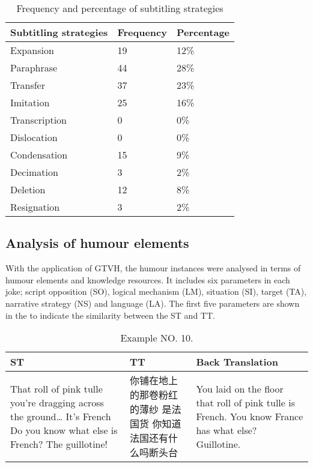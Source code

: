 \documentclass[english]{textolivre}
\begin{document}
\begin{table}[htpb]
\caption{Frequency and percentage of subtitling strategies}
\label{tbl09}
\begin{tabularx}{\linewidth}{XXX}
\toprule 
Subtitling strategies  & Frequency & Percentage \\ 
\midrule
Expansion & 19 & 12\% \\
Paraphrase & 44 & 28\% \\
Transfer & 37 & 23\% \\
Imitation & 25 & 16\% \\
Transcription & 0  & 0\% \\
Dislocation & 0  & 0\% \\
Condensation & 15  & 9\% \\
Decimation & 3  & 2\% \\
Deletion & 12  & 8\% \\
Resignation & 3  & 2\% \\
\bottomrule
\end{tabularx}
\end{table}

\subsection{Analysis of humour elements}

With the application of GTVH, the humour instances were analysed in terms of humour elements and knowledge resources. It includes six parameters in each joke; script opposition (SO), logical mechanism (LM), situation (SI), target (TA), narrative strategy (NS) and language (LA). The first five parameters are shown in the  to indicate the similarity between the ST and TT. 

\begin{table}[htpb]
\caption{Example NO. 10.}
\label{tbl10}
\begin{tabularx}{\linewidth}{XXX}
\toprule 
ST  & TT & Back Translation \\ 
\midrule
That roll of pink tulle you're dragging across the ground… 
It's French  
Do you know what else is French? 
The guillotine!  & 你铺在地上的那卷粉红的薄纱 
是法国货  
你知道法国还有什么吗断头台  &You laid on the floor that roll of pink tulle is French. 
You know France has what else? 
Guillotine. \\ 
\bottomrule
\end{tabularx}
\end{table}
\end{document}
